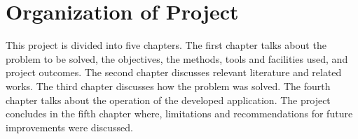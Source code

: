 \section{Organization of Project}
This project is divided into five chapters. The first chapter talks about the problem to be solved, the objectives, the methods, tools and facilities used, and project outcomes. The second chapter discusses relevant literature and related works. The third chapter discusses how the problem was solved. The fourth chapter talks about the operation of the developed application. The project concludes in the fifth chapter where, limitations and recommendations for future improvements were discussed.

